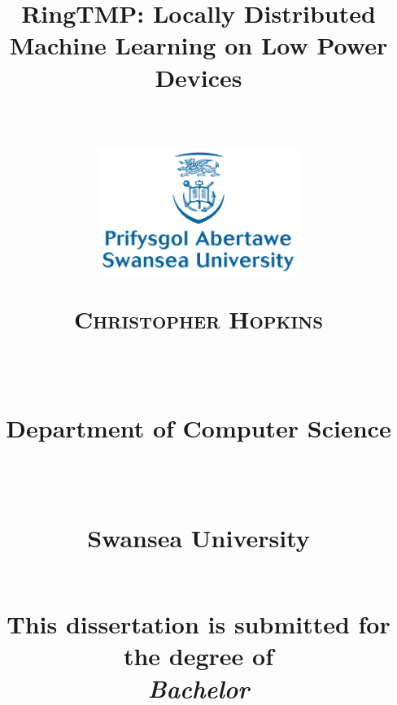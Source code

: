 
\newcommand{\horrule}[1]{\rule{\linewidth}{#1}} %
\title{
\begin{Huge}\textbf{RingTMP: Locally Distributed Machine Learning on Low Power Devices} \end{Huge} \\%
\vspace{70px}
\includegraphics[width = 65mm]{Figs/SwanseaUniversity.png}\\[8ex]
\begin{large} \textsc{\textbf{Christopher Hopkins}} \end{large} \\ %
\vspace{10px}
\normalfont \normalsize 
\begin{normalsize}Department of Computer Science \end{normalsize}\\  %
\begin{normalsize} Swansea University \end{normalsize} \\ %
\vspace{60px}
This dissertation is submitted for the degree of\\
\textit{Bachelor}
\vspace{20px}
}

